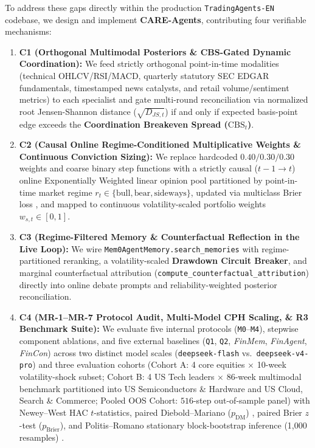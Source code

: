 \documentclass[10pt,a4paper,twocolumn]{article}
\begin{document}
To address these gaps directly within the production \texttt{TradingAgents-EN} codebase, we design and implement \textbf{CARE-Agents}, contributing four verifiable mechanisms:
\begin{enumerate}
  \setlength{\itemsep}{1pt}\setlength{\parskip}{0pt}
  \item \textbf{C1 (Orthogonal Multimodal Posteriors \& CBS-Gated Dynamic Coordination):} We feed strictly orthogonal point-in-time modalities (technical OHLCV/RSI/MACD, quarterly statutory SEC EDGAR fundamentals, timestamped news catalysts, and retail volume/sentiment metrics) to each specialist and gate multi-round reconciliation via normalized root Jensen-Shannon distance ($\sqrt{D_{JS,t}}$) if and only if expected basis-point edge exceeds the \textbf{Coordination Breakeven Spread ($\text{CBS}_t$)}.
  \item \textbf{C2 (Causal Online Regime-Conditioned Multiplicative Weights \& Continuous Conviction Sizing):} We replace hardcoded $0.40/0.30/0.30$ weights and coarse binary step functions with a strictly causal ($t-1 \to t$) online Exponentially Weighted linear opinion pool partitioned by point-in-time market regime $r_t \in \{\text{bull}, \text{bear}, \text{sideways}\}$, updated via multiclass Brier loss \cite{brier1950verification,cesa2006prediction}, and mapped to continuous volatility-scaled portfolio weights $w_{s,t} \in [0, 1]$.
  \item \textbf{C3 (Regime-Filtered Memory \& Counterfactual Reflection in the Live Loop):} We wire \texttt{Mem0AgentMemory.search\_memories} with regime-partitioned reranking, a volatility-scaled \textbf{Drawdown Circuit Breaker}, and marginal counterfactual attribution (\texttt{compute\_counterfactual\_attribution}) directly into online debate prompts and reliability-weighted posterior reconciliation.
  \item \textbf{C4 (MR-1--MR-7 Protocol Audit, Multi-Model CPH Scaling, \& R3 Benchmark Suite):} We evaluate five internal protocols (\texttt{M0}--\texttt{M4}), stepwise component ablations, and five external baselines (\texttt{Q1}, \texttt{Q2}, \textit{FinMem}, \textit{FinAgent}, \textit{FinCon}) across two distinct model scales (\texttt{deepseek-flash} vs.\ \texttt{deepseek-v4-pro}) and three evaluation cohorts (Cohort A: 4 core equities $\times$ 10-week volatility-shock subset; Cohort B: 4 US Tech leaders $\times$ 86-week multimodal benchmark partitioned into US Semiconductors \& Hardware and US Cloud, Search \& Commerce; Pooled OOS Cohort: $516$-step out-of-sample panel) with Newey--West HAC $t$-statistics, paired Diebold--Mariano ($p_{\text{DM}}$) \cite{diebold1995comparing}, paired Brier $z$-test ($p_{\text{Brier}}$), and Politis--Romano stationary block-bootstrap inference (1,000 resamples) \cite{politis1994stationary}.
\end{enumerate}
\end{document}
